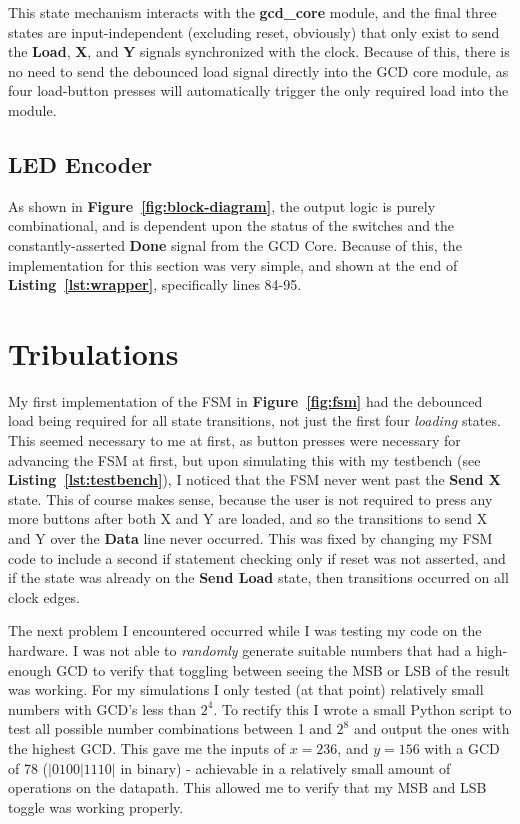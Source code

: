 \documentclass[a4paper, 12pt]{article}
\begin{document}
This state mechanism interacts with the \textbf{gcd\_core} module, and the final three states are input-independent (excluding reset, obviously) that only exist to send the \textbf{Load}, \textbf{X}, and \textbf{Y} signals synchronized with the clock. Because of this, there is no need to send the debounced load signal directly into the GCD core module, as four load-button presses will automatically trigger the only required load into the module.

\subsection{LED Encoder}
\label{subsec:led-encoder}
As shown in \textbf{Figure~\ref{fig:block-diagram}}, the output logic is purely combinational, and is dependent upon the status of the switches and the constantly-asserted \textbf{Done} signal from the GCD Core. Because of this, the implementation for this section was very simple, and shown at the end of \textbf{Listing~\ref{lst:wrapper}}, specifically lines 84-95.

\section{Tribulations}
\label{sec:tribulations}
My first implementation of the FSM in \textbf{Figure~\ref{fig:fsm}} had the debounced load being required for all state transitions, not just the first four \textit{loading} states. This seemed necessary to me at first, as button presses were necessary for advancing the FSM at first, but upon simulating this with my testbench (see \textbf{Listing~\ref{lst:testbench}}), I noticed that the FSM never went past the \textbf{Send X} state. This of course makes sense, because the user is not required to press any more buttons after both X and Y are loaded, and so the transitions to send X and Y over the \textbf{Data} line never occurred. This was fixed by changing my FSM code to include a second if statement checking only if reset was not asserted, and if the state was already on the \textbf{Send Load} state, then transitions occurred on all clock edges.

The next problem I encountered occurred while I was testing my code on the hardware. I was not able to \textit{randomly} generate suitable numbers that had a high-enough GCD to verify that toggling between seeing the MSB or LSB of the result was working. For my simulations I only tested (at that point) relatively small numbers with GCD's less than $2^4$. To rectify this I wrote a small Python script to test all possible number combinations between 1 and $2^8$ and output the ones with the highest GCD. This gave me the inputs of $x=236$, and $y=156$ with a GCD of 78 ($|0100|1110|$ in binary) - achievable in a relatively small amount of operations on the datapath. This allowed me to verify that my MSB and LSB toggle was working properly.
\end{document}
